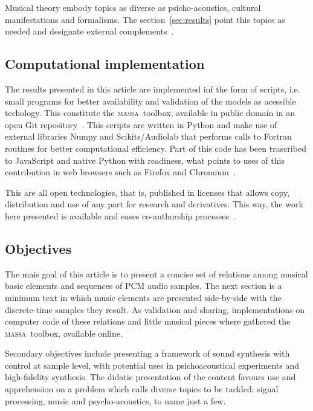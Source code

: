 \documentclass[
 aip,
 jmp,
 amsmath,amssymb,
 reprint,
]{revtex4-1}
\newcommand{\massa}{{\large \textsc{massa}}}
\begin{document}
Musical theory embody topics as diverse as psicho-acoustics, cultural manifestations and formalisms. The section~\ref{sec:results} point this topics as needed and designate external complements~\cite{Zamacois,Schoenberg,microsound}.

\subsection{Computational implementation}
The results presented in this article are implemented inf the form of scripts, i.e. small programs for better availability and validation of the models as acessible techology.  This constitute the \massa\ toolbox, available in public domain in an open Git repository~\cite{gitBook}. This scripts are written in Python and make use of external libraries Numpy and Scikits/Audiolab that performs calls to Fortran routines for better computational efficiency. Part of this code has been trascribed to JavaScript and native Python with readiness, what points to uses of this contribution in web browsers such as Firefox and Chromium~\cite{numpy, audiolab, tutpython, python}.

This are all open technologies, that is, published in licenses that allows copy, distribution and use of any part for research and derivatives. This way, the work here presented is available and eases co-authorship processes~\cite{Raymond,Lessig}. 

\subsection{Objectives}
\label{subsec:objectives}
The mais goal of this article is to present a concise set of relations among musical basic elements and sequences of PCM audio samples. The next section is a minimum text in which music elements are presented side-by-side with the discrete-time samples they result. As validation and sharing, implementations on computer code of these relations and little musical pieces where gathered the \massa\ toolbox, available online.

Secondary objectives include presenting a framework of sound synthesis with control at sample level, with potential uses in psichoacoustical experiments and high-fidelity synthesis. The didatic presentation of the content favours use and apprehension on a problem which calls diverse topics to be tackled: signal processing, music and psycho-acoustics, to name just a few.
\end{document}
